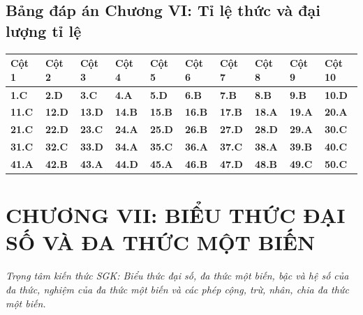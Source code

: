 \documentclass[11pt,a4paper]{article}
\begin{document}
\subsection*{\color{primary} Bảng đáp án Chương VI: Tỉ lệ thức và đại lượng tỉ lệ}
\begin{center}
\renewcommand{\arraystretch}{1.25}
\begin{tabularx}{\textwidth}{*{10}{>{\centering\arraybackslash}X}}
\toprule
\textbf{\color{primary} Cột 1} & \textbf{\color{primary} Cột 2} & \textbf{\color{primary} Cột 3} & \textbf{\color{primary} Cột 4} & \textbf{\color{primary} Cột 5} & \textbf{\color{primary} Cột 6} & \textbf{\color{primary} Cột 7} & \textbf{\color{primary} Cột 8} & \textbf{\color{primary} Cột 9} & \textbf{\color{primary} Cột 10} \\
\midrule
\textbf{1.C} & \textbf{2.D} & \textbf{3.C} & \textbf{4.A} & \textbf{5.D} & \textbf{6.B} & \textbf{7.B} & \textbf{8.B} & \textbf{9.B} & \textbf{10.D} \\
\rowcolor{rowtint} \textbf{11.C} & \textbf{12.D} & \textbf{13.D} & \textbf{14.B} & \textbf{15.B} & \textbf{16.B} & \textbf{17.B} & \textbf{18.A} & \textbf{19.A} & \textbf{20.A} \\
\textbf{21.C} & \textbf{22.D} & \textbf{23.C} & \textbf{24.A} & \textbf{25.D} & \textbf{26.B} & \textbf{27.D} & \textbf{28.D} & \textbf{29.A} & \textbf{30.C} \\
\rowcolor{rowtint} \textbf{31.C} & \textbf{32.C} & \textbf{33.D} & \textbf{34.A} & \textbf{35.C} & \textbf{36.A} & \textbf{37.C} & \textbf{38.A} & \textbf{39.B} & \textbf{40.C} \\
\textbf{41.A} & \textbf{42.B} & \textbf{43.A} & \textbf{44.D} & \textbf{45.A} & \textbf{46.B} & \textbf{47.D} & \textbf{48.B} & \textbf{49.C} & \textbf{50.C} \\
\bottomrule
\end{tabularx}
\end{center}\vspace{10pt}
\section*{\color{primary} CHƯƠNG VII: BIỂU THỨC ĐẠI SỐ VÀ ĐA THỨC MỘT BIẾN}
\textit{Trọng tâm kiến thức SGK: Biểu thức đại số, đa thức một biến, bậc và hệ số của đa thức, nghiệm của đa thức một biến và các phép cộng, trừ, nhân, chia đa thức một biến.}\par\vspace{4pt}
\end{document}
